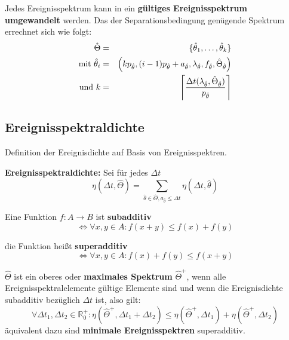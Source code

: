 \begin{tcolorbox}
    Jedes Ereignisspektrum kann in ein \textbf{gültiges Ereignisspektrum umgewandelt}
    werden. Das der Separationsbedingung genügende Spektrum errechnet sich wie folgt:
    \begin{eqnarray}
        \hat{\Theta} &=& \{\hat{\theta}_1, \ldots, \hat{\theta}_k\} \\
        \text{mit } \hat{\theta}_i &=& \left(
            k p_{\hat{\theta}}, (i-1) p_{\hat{\theta}} + a_{\hat{\theta}},
            \lambda_{\hat{\theta}}, f_{\hat{\theta}}, \hat{\Theta}_{\hat{\theta}}\right) \\
        \text{und } k &=& \ceil*{\frac{\Delta t(\lambda_{\hat{\theta}}, \hat{\Theta}_{\hat{\theta}})}{p_{\hat{\theta}}}}
    \end{eqnarray}
\end{tcolorbox}

\subsection{Ereignisspektraldichte}
Definition der Ereignisdichte auf Basis von Ereignisspektren.

\begin{tcolorbox}
    \textbf{Ereignisspektraldichte:} Sei für jedes $\Delta t$
    \begin{equation}
        \eta(\Delta t, \hat{\Theta}) = \sum_{\hat{\theta} \in \hat{\Theta}, 
            a_{\hat{\theta}} \leq \Delta t}
            \eta(\Delta t, \hat{\theta})
    \end{equation}
\end{tcolorbox}

\begin{tcolorbox}
    Eine Funktion $f: A \to B$ ist \textbf{subadditiv}
    \begin{equation}
        \Leftrightarrow \forall x, y \in A:
            f(x+y) \leq f(x) + f(y)
    \end{equation} 

    die Funktion heißt \textbf{superadditiv}
    \begin{equation}
        \Leftrightarrow \forall x, y \in A:
            f(x) + f(y) \leq f(x+y)
    \end{equation}
\end{tcolorbox}

\begin{tcolorbox}
    $\hat{\Theta}$ ist ein oberes oder \textbf{maximales Spektrum} $\hat{\Theta}^+$, 
    wenn alle
    Ereignisspektralelemente gültige Elemente sind und wenn die Ereignisdichte
    subadditiv bezüglich $\Delta t$ ist, also gilt:
    \begin{equation}
        \forall \Delta t_1, \Delta t_2 \in \mathbb{R}^+_0:
            \eta(\hat{\Theta}^+ , \Delta t_1 + \Delta t_2) \leq
            \eta(\hat{\Theta}^+ , \Delta t_1) +\eta(\hat{\Theta}^+ , \Delta t_2)
    \end{equation}
    äquivalent dazu sind \textbf{minimale Ereignisspektren} superadditiv.
\end{tcolorbox}

